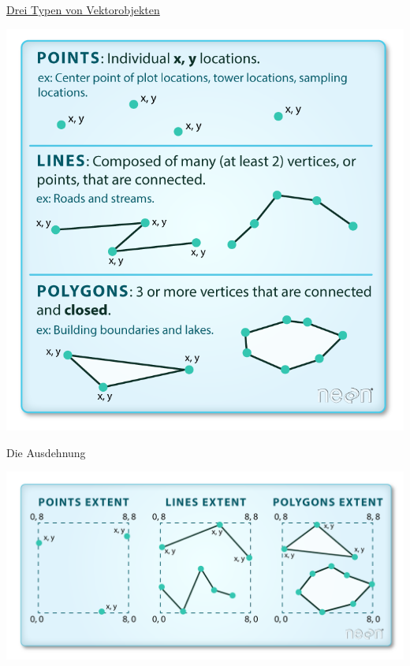 \documentclass[ignorenonframetext,]{beamer}
\begin{document}
\begin{frame}{\href{https://www.earthdatascience.org/courses/earth-analytics/spatial-data-r/intro-vector-data-r/}{Drei
Typen von Vektorobjekten}}
\protect\hypertarget{drei-typen-von-vektorobjekten}{}

\includegraphics{figure/points-lines-polygons-vector-data-types.png}

\end{frame}

\begin{frame}{Die Ausdehnung}
\protect\hypertarget{die-ausdehnung}{}

\includegraphics{figure/spatial-extent.png}

\end{frame}
\end{document}
